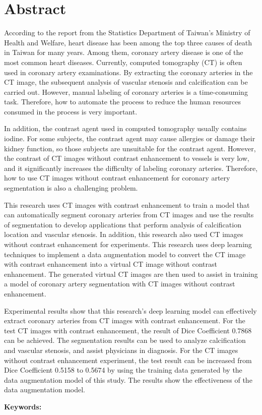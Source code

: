 \documentclass[class=NCU_thesis, crop=false]{standalone}
\begin{document}
\chapter{Abstract}
According to the report from the Statistics Department of Taiwan’s Ministry of Health and Welfare,
heart disease has been among the top three causes of death in Taiwan for many years.
Among them, coronary artery disease is one of the most common heart diseases.
Currently, computed tomography (CT) is often used in coronary artery examinations.
By extracting the coronary arteries in the CT image,
the subsequent analysis of vascular stenosis and calcification can be carried out.
However, manual labeling of coronary arteries is a time-consuming task.
Therefore, how to automate the process to reduce the human resources consumed in the process is very important.

In addition, the contrast agent used in computed tomography usually contains iodine.
For some subjects, the contrast agent may cause allergies or damage their kidney function, so those subjects are unsuitable for the contrast agent.
However, the contrast of CT images without contrast enhancement to vessels is very low, and it significantly increases the difficulty of labeling coronary arteries.
Therefore, how to use CT images without contrast enhancement for coronary artery segmentation is also a challenging problem.

This research uses CT images with contrast enhancement to train a model that can automatically segment coronary arteries from CT images and use the results of segmentation to develop applications that perform analysis of calcification location and vascular stenosis.
In addition, this research also used CT images without contrast enhancement for experiments.
This research uses deep learning techniques to implement a data augmentation model to convert the CT image with contrast enhancement into a virtual CT image without contrast enhancement.
The generated virtual CT images are then used to assist in training a model of coronary artery segmentation with CT images without contrast enhancement.

Experimental results show that this research's deep learning model can effectively extract coronary arteries from CT images with contrast enhancement.
For the test CT images with contrast enhancement, the result of Dice Coefficient 0.7868 can be achieved.
The segmentation results can be used to analyze calcification and vascular stenosis, and assist physicians in diagnosis.
For the CT images without contrast enhancement experiment, the test result can be increased from Dice Coefficient 0.5158 to 0.5674 by using the training data generated by the data augmentation model of this study.
The results show the effectiveness of the data augmentation model.

\vspace{2em}
\noindent \textbf{Keywords:} \keywordsEn{} %
\end{document}
